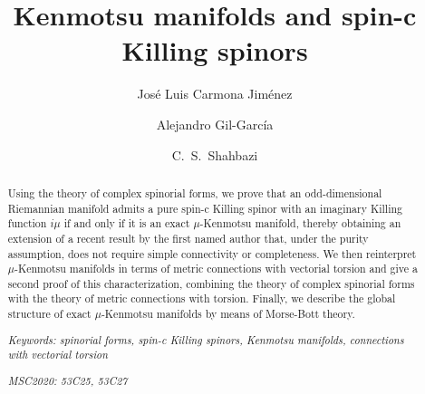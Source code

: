 \documentclass[10pt,a4paper,twoside,reqno]{amsart}
\theoremstyle{plain}
\theoremstyle{definition}
\theoremstyle{remark}
\begin{document}
\title[Kenmotsu manifolds and spin-c Killing spinors]{Kenmotsu manifolds and spin-c Killing spinors}

\author[J.\ L.\ Carmona Jiménez]{José Luis Carmona Jiménez }
\address{Institute of Mathematics “Simion Stoilow” of the Romanian Academy, 21 Calea Grivitei, 010702 Bucharest, Romania}

\author[A.\ Gil-García]{Alejandro Gil-García }
\address{Scuola Internazionale Superiore di Studi Avanzati, Trieste, Italy}

\author[C.\ S.\ Shahbazi]{C.\ S.\ Shahbazi }
\address{Departamento de Matem\'aticas, Universidad UNED - Madrid, Reino de Espa\~na}

\begin{abstract}
Using the theory of complex spinorial forms, we prove that an odd-dimensional Riemannian manifold admits a pure spin-c Killing spinor with an imaginary Killing function $i\mu$ if and only if it is an exact $\mu$-Kenmotsu manifold, thereby obtaining an extension of a recent result by the first named author that, under the purity assumption, does not require simple connectivity or completeness. We then reinterpret $\mu$-Kenmotsu manifolds in terms of metric connections with vectorial torsion and give a second proof of this characterization, combining the theory of complex spinorial forms with the theory of metric connections with torsion. Finally, we describe the global structure of exact $\mu$-Kenmotsu manifolds by means of Morse-Bott theory.\bigskip

\noindent
\emph{Keywords: spinorial forms, spin-c Killing spinors, Kenmotsu manifolds, connections with vectorial torsion}\medskip

\noindent
\emph{MSC2020: 53C25, 53C27}

\end{abstract}

\maketitle

\setcounter{tocdepth}{1} %

\tableofcontents

\end{document}
